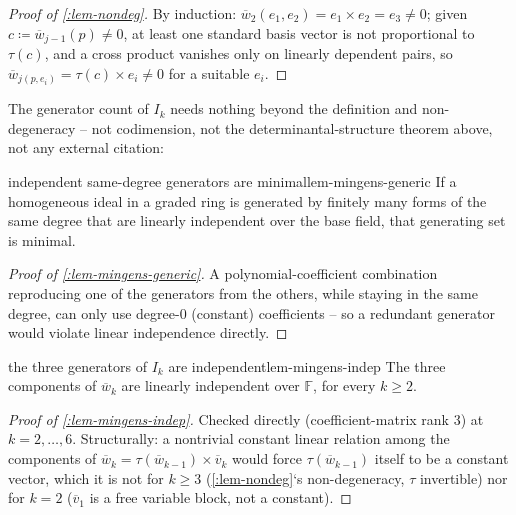 \documentclass[a4paper,11pt]{scrartcl}
\begin{document}
\begin{proof}[Proof of \cref{:lem-nondeg}] By induction: \({\overline{w}}_{2}\left( e_{1},e_{2} \right) = e_{1} \times e_{2} = e_{3} \neq 0\); given \(c ≔ {\overline{w}}_{j - 1}(p) \neq 0\), at least one standard basis vector is not proportional to \(\tau(c)\), and a cross product vanishes only on linearly dependent pairs, so \({\overline{w}}_{j\left( p,e_{i} \right)} = \tau(c) \times e_{i} \neq 0\) for a suitable \(e_{i}\).

\end{proof}

The generator count of \(I_{k}\) needs nothing beyond the definition and non-degeneracy -- not codimension, not the determinantal-structure theorem above, not any external citation:

\begin{lemma}{independent same-degree generators are minimal}{lem-mingens-generic} If a homogeneous ideal in a graded ring is generated by finitely many forms of the same degree that are linearly independent over the base field, that generating set is minimal.

\end{lemma} \protect{}\label{lem-mingens-generic}{}

\begin{proof}[Proof of \cref{:lem-mingens-generic}] A polynomial-coefficient combination reproducing one of the generators from the others, while staying in the same degree, can only use degree-0 (constant) coefficients -- so a redundant generator would violate linear independence directly.

\end{proof}

\begin{lemma}{the three generators of \(I_{k}\) are independent}{lem-mingens-indep} The three components of \({\overline{w}}_{k}\) are linearly independent over \(\mathbb{F}\), for every \(k \geq 2\).

\end{lemma} \protect{}\label{lem-mingens-indep}{}

\begin{proof}[Proof of \cref{:lem-mingens-indep}] Checked directly (coefficient-matrix rank 3) at \(k = 2,\ldots,6\). Structurally: a nontrivial constant linear relation among the components of \({\overline{w}}_{k} = \tau({\overline{w}}_{k - 1}) \times {\overline{v}}_{k}\) would force \(\tau({\overline{w}}_{k - 1})\) itself to be a constant vector, which it is not for \(k \geq 3\) (\cref{:lem-nondeg}`s non-degeneracy, \(\tau\) invertible) nor for \(k = 2\) (\({\overline{v}}_{1}\) is a free variable block, not a constant).

\end{proof}
\end{document}
